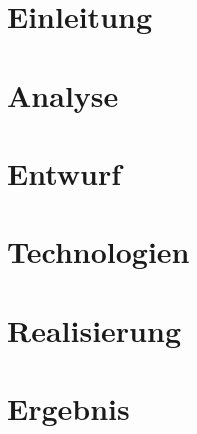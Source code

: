 \documentclass[a4paper, 12pt, parskip=half]{scrbook}
\title{\thesisTitle}
\author{\thesisAuthor}
\date{\today{}}
\begin{document}
	\frontmatter
	
	
	\cleardoublepage
	\pagestyle{scrheadings}
	
	\tableofcontents	

	
	\mainmatter
	
	\rofoot[\textbf{\headmark~~$\mid$~~\pagemark}]{\textbf{\headmark~~$\mid$~~\pagemark}}
	
	\chapter{Einleitung}
	\label{chap:Einleitung}
	
	
	
	
	\chapter{Analyse}
	\label{chap:Analyse}
	
	
	
	
	
	
	
	
	\chapter{Entwurf}
	\label{chap:Entwurf}
	
	
	\chapter{Technologien}
	\label{chap:Technologien}
	
	
	
	
	\chapter{Realisierung}
	\label{chap:Realisierung}
	
	\chapter{Ergebnis}
	
\end{document}
